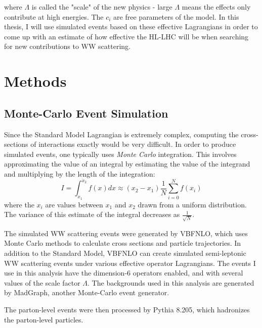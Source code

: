 \documentclass[10pt]{ucscthesisbs}
\begin{document}
where $\Lambda$ is called the "scale" of the new physics - large $\Lambda$ means the effects only contribute at high energies. The $c_i$ are free parameters of the model. In this thesis, I will use simulated events based on these effective Lagrangians in order to come up with an estimate of how effective the HL-LHC will be when searching for new contributions to WW scattering.
\chapter{Methods}
\section{Monte-Carlo Event Simulation}
Since the Standard Model Lagrangian is extremely complex, computing the cross-sections of interactions exactly would be very difficult. In order to produce simulated events, one typically uses \textit{Monte Carlo} integration. This involves approximating the value of an integral by estimating the value of the integrand and multiplying by the length of the integration:
\begin{equation}
I = \int_{x_1}^{x_2}{f(x)dx} \approx (x_2 - x_1)\frac{1}{N}\sum_{i=0}^{N}{f(x_i)}
\end{equation}
where the $x_i$ are values between $x_1$ and $x_2$ drawn from a uniform distribution. \cite{MonteCarloHowTo} The variance of this estimate of the integral decreases as $\frac{1}{\sqrt{N}}$. 

The simulated WW scattering events were generated by VBFNLO, which uses Monte Carlo methods to calculate cross sections and particle trajectories. \cite{vbfnlo1}\cite{vbfnlo2} In addition to the Standard Model, VBFNLO can create simulated semi-leptonic WW scattering events under various effective operator Lagrangians. The events I use in this analysis have the dimension-6 operators enabled, and with several values of the scale factor $\Lambda$. The backgrounds used in this analysis are generated by MadGraph, another Monte-Carlo event generator. \cite{madgraph}\par
The parton-level events were then processed by Pythia 8.205, which hadronizes the parton-level particles. \cite{pythia}
\end{document}

